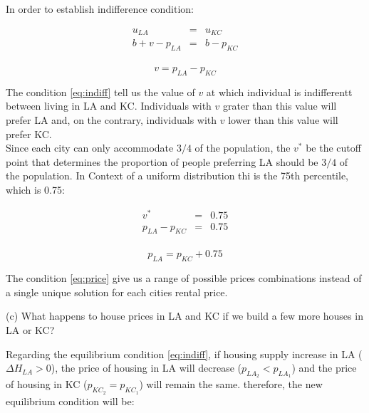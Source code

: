 In order to establish indifference condition:

\begin{eqnarray*}
    u_{LA} &=& u_{KC}\\
    b + v - p_{LA} &=& b - p_{KC}\\
\end{eqnarray*}

\begin{equation}
    v = p_{LA} - p_{KC}
    \label{eq:indiff}
\end{equation}

The condition \ref{eq:indiff} tell us the value of $v$ at which individual is indifferentt between living in LA and KC. Individuals with $v$ grater than this value will prefer LA and, on the contrary, individuals with $v$ lower than this value will prefer KC.\\

Since each city can only accommodate $3/4$ of the population, the $v^*$ be the cutoff point that determines the proportion of people preferring LA should be $3/4$ of the population. In Context of a uniform distribution thi is the 75th percentile, which is 0.75:

\begin{eqnarray*}
    v^* &=& 0.75\\
    p_{LA} - p_{KC} &=& 0.75\\
\end{eqnarray*}

\begin{myanswerbox}
    \begin{equation}
        p_{LA} = p_{KC} + 0.75
        \label{eq:price}
    \end{equation}

    The condition \ref{eq:price} give us a range of possible prices combinations instead of a single unique solution for each cities rental price. 
\end{myanswerbox}
\begin{tcolorbox}
    (c) What happens to house prices in LA and KC if we build a few more houses in LA or KC?
\end{tcolorbox}

Regarding the equilibrium condition \ref{eq:indiff},  if housing supply increase in LA ($\Delta H_{LA} > 0$), the price of housing in LA will decrease ($p_{LA_2} < p_{LA_1}$) and the price of housing in KC ($p_{KC_2} = p_{KC_1}$) will remain the same. therefore, the new equilibrium condition will be:

